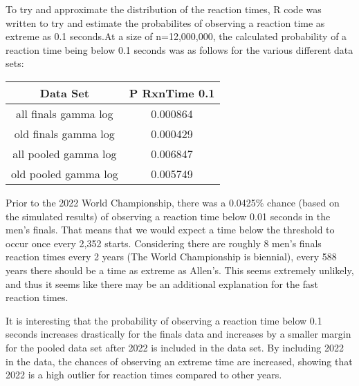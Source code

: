 \documentclass[12pt, letterpaper, titlepage]{article}
\begin{document}
To try and approximate the distribution of the reaction times, R code was written
to try and estimate the probabilites of observing a reaction time as extreme as
0.1 seconds.At a size of n=12,000,000, the calculated probability of a reaction
time being below 0.1 seconds was as follows for the various different data sets:

\begin{center}
  \begin{tabular}{||c|c||} 
   \hline
   Data Set & P RxnTime 0.1 \\ 
   \hline\hline
   all finals gamma log & 0.000864 \\ 
   \hline
   old finals gamma log & 0.000429 \\
   \hline
   all pooled gamma log & 0.006847 \\
   \hline
   old pooled gamma log & 0.005749 \\
  \end{tabular}
  \end{center}

Prior to the 2022 World Championship, there was a 0.0425\% chance (based on the
simulated results) of observing a reaction time below 0.01 seconds in the men's
finals.  That means that we would expect a time below the threshold to occur
once every 2,352 starts.  Considering there are roughly 8 men's finals reaction
times every 2 years (The World Championship is biennial), every 588 years there
should be a time as extreme as Allen's.  This seems extremely unlikely, and thus
it seems like there may be an additional explanation for the fast reaction times.

It is interesting that the probability of observing a reaction time below 0.1
seconds increases drastically for the finals data and increases by a smaller margin
for the pooled data set after 2022 is included in the data set.  By including 2022
in the data, the chances of observing an extreme time are increased, showing that
2022 is a high outlier for reaction times compared to other years.
\end{document}
